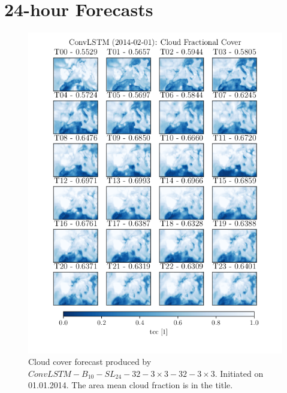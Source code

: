 \chapter{24-hour Forecasts}
\begin{figure}[ht]
    \centering
    \includegraphics{python_figs/timelapse_convlstm_24hrs_from_2014-02-01.png}
    \caption{Cloud cover forecast produced by $ConvLSTM-B_{10}-SL_{24}-32-3\times3-32-3\times3$. Initiated on 01.01.2014. The area mean  cloud fraction is in the title.}
    \label{fig:timelapse_3x3}
\end{figure}
